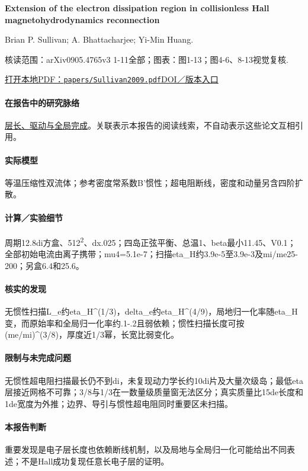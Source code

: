 \documentclass[UTF8,a4paper,11pt,openany,fontset=fandol]{ctexbook}
\begin{document}
\textbf{Extension of the electron dissipation region in collisionless Hall magnetohydrodynamics reconnection}\citep{Sullivan2009}\

Brian P. Sullivan;  A. Bhattacharjee;  Yi-Min Huang.

\textsf{核读范围：}arXiv0905.4765v3 1-11全部；\textsf{图表：}图1-13；图4-6、8-13视觉复核.

\href{run:../papers/Sullivan2009.pdf}{打开本地PDF：\texttt{papers/Sullivan2009.pdf}}\quad\href{https://doi.org/10.1063/1.3251423}{DOI／版本入口}

\paragraph{在报告中的研究脉络}\hyperref[story:global]{层长、驱动与全局完成}。关联表示本报告的阅读线索，不自动表示这些论文互相引用。

\paragraph{实际模型}等温压缩性双流体；参考密度常系数B'惯性；超电阻断线，密度和动量另含四阶扩散。

\paragraph{计算／实验细节}周期12.8di方盒、512\textsuperscript{2}、dx.025；四岛正弦平衡、总温1、beta最小11.45、V0.1；全部初始电流由离子携带；mu4=5.1e-7；扫描eta\_H约3.9e-5至3.9e-3及mi/me25-200；另盒6.4和25.6。

\paragraph{核实的发现}无惯性扫描L\_e约eta\_H\textasciicircum{}(1/3)，delta\_e约eta\_H\textasciicircum{}(4/9)，局地归一化率随eta\_H变，而原始率和全局归一化率约.1-.2且弱依赖；惯性扫描长度可按(me/mi)\textasciicircum{}(3/8)，厚度近1/3幂，长宽比弱变化。

\paragraph{限制与未完成问题}无惯性超电阻扫描最长仍不到di，未复现动力学长约10di片及大量次级岛；最低eta层接近网格不可靠；3/8与1/3在一数量级质量窗无法区分；真实质量比15de长度和1de宽度为外推；边界、导引与惯性超电阻同时重要区未扫描。

\paragraph{本报告判断}重要发现是电子层长度也依赖断线机制，以及局地与全局归一化可能给出不同表述；不是Hall成功复现任意长电子层的证明。
\end{document}
